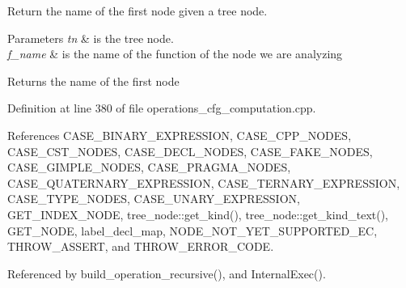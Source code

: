 Return the name of the first node given a tree node. 


\begin{DoxyParams}{Parameters}
{\em tn} & is the tree node. \\
\hline
{\em f\+\_\+name} & is the name of the function of the node we are analyzing \\
\hline
\end{DoxyParams}
\begin{DoxyReturn}{Returns}
the name of the first node 
\end{DoxyReturn}


Definition at line 380 of file operations\+\_\+cfg\+\_\+computation.\+cpp.



References C\+A\+S\+E\+\_\+\+B\+I\+N\+A\+R\+Y\+\_\+\+E\+X\+P\+R\+E\+S\+S\+I\+ON, C\+A\+S\+E\+\_\+\+C\+P\+P\+\_\+\+N\+O\+D\+ES, C\+A\+S\+E\+\_\+\+C\+S\+T\+\_\+\+N\+O\+D\+ES, C\+A\+S\+E\+\_\+\+D\+E\+C\+L\+\_\+\+N\+O\+D\+ES, C\+A\+S\+E\+\_\+\+F\+A\+K\+E\+\_\+\+N\+O\+D\+ES, C\+A\+S\+E\+\_\+\+G\+I\+M\+P\+L\+E\+\_\+\+N\+O\+D\+ES, C\+A\+S\+E\+\_\+\+P\+R\+A\+G\+M\+A\+\_\+\+N\+O\+D\+ES, C\+A\+S\+E\+\_\+\+Q\+U\+A\+T\+E\+R\+N\+A\+R\+Y\+\_\+\+E\+X\+P\+R\+E\+S\+S\+I\+ON, C\+A\+S\+E\+\_\+\+T\+E\+R\+N\+A\+R\+Y\+\_\+\+E\+X\+P\+R\+E\+S\+S\+I\+ON, C\+A\+S\+E\+\_\+\+T\+Y\+P\+E\+\_\+\+N\+O\+D\+ES, C\+A\+S\+E\+\_\+\+U\+N\+A\+R\+Y\+\_\+\+E\+X\+P\+R\+E\+S\+S\+I\+ON, G\+E\+T\+\_\+\+I\+N\+D\+E\+X\+\_\+\+N\+O\+DE, tree\+\_\+node\+::get\+\_\+kind(), tree\+\_\+node\+::get\+\_\+kind\+\_\+text(), G\+E\+T\+\_\+\+N\+O\+DE, label\+\_\+decl\+\_\+map, N\+O\+D\+E\+\_\+\+N\+O\+T\+\_\+\+Y\+E\+T\+\_\+\+S\+U\+P\+P\+O\+R\+T\+E\+D\+\_\+\+EC, T\+H\+R\+O\+W\+\_\+\+A\+S\+S\+E\+RT, and T\+H\+R\+O\+W\+\_\+\+E\+R\+R\+O\+R\+\_\+\+C\+O\+DE.



Referenced by build\+\_\+operation\+\_\+recursive(), and Internal\+Exec().

